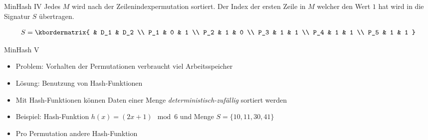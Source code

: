 \begin{frame}{MinHash IV}
    Jedes $ M $ wird nach der Zeilenindexpermutation sortiert. Der Index der ersten Zeile in $ M $ welcher den Wert $ 1 $ hat wird in die Signatur $ S $ übertragen.


    \begin{example}
        \begin{equation*}
            S = 
            \kbordermatrix{
                & D_1 & D_2 \\
                P_1 & 0 & 1 \\
                P_2 & 1 & 0 \\
                P_3 & 1 & 1 \\
                P_4 & 1 & 1 \\
                P_5 & 1 & 1
            }
        \end{equation*}
    \end{example}
\end{frame}

\begin{frame}{MinHash V}
    \begin{itemize}
        \item Problem: Vorhalten der Permutationen verbraucht viel Arbeitsspeicher
        \item Lösung: Benutzung von Hash-Funktionen
        \item Mit Hash-Funktionen können Daten einer Menge \textit{deterministisch-zufällig} sortiert werden
        \item Beispiel: Hash-Funktion $ h(x) = (2x+1) \mod 6 $ und Menge $ S = \{ 10,11,30,41 \} $
        \item Pro Permutation andere Hash-Funktion
    \end{itemize}
\end{frame}

